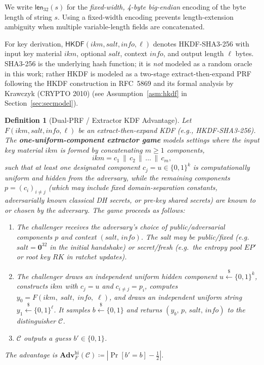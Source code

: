 \documentclass[11pt,a4paper]{article}
\newtheorem{definition}[theorem]{Definition}
\theoremstyle{remark}
\theoremstyle{plain}
\newcommand{\Adv}{\mathbf{Adv}}
\newcommand{\bits}{\{0,1\}}
\newcommand{\getsr}{\stackrel{\$}{\leftarrow}}
\newcommand{\HKDF}{\mathsf{HKDF}}
\newcommand{\flen}[1]{\mathsf{len}_{32}(#1)}
\begin{document}
We write $\flen{s}$ for the \emph{fixed-width, 4-byte big-endian} encoding of the byte length
of string $s$.  Using a fixed-width encoding prevents length-extension ambiguity when multiple
variable-length fields are concatenated.

For key derivation, $\HKDF(ikm, salt, info, \ell)$ denotes HKDF-SHA3-256 with input key
material $ikm$, optional $salt$, context $info$, and output length $\ell$ bytes.  SHA3-256 is
the underlying hash function; it is \emph{not} modeled as a random oracle in this work; rather
HKDF is modeled as a two-stage extract-then-expand PRF following the HKDF construction in
RFC~5869 \cite{rfc5869} and its formal analysis by Krawczyk (CRYPTO 2010)
\cite{krawczyk2010hkdf} (see Assumption~\ref{asm:hkdf} in
Section~\ref{sec:secmodel}).

\begin{definition}[Dual-PRF / Extractor KDF Advantage]
\label{def:kdf-hi}
Let $F(ikm, salt, info, \ell)$ be an extract-then-expand KDF (e.g., HKDF-SHA3-256).
The \textbf{one-uniform-component extractor game} models settings where the
input key material $ikm$ is formed by concatenating $m \geq 1$ components,
\[
  ikm = c_1 \,\|\, c_2 \,\|\, \dots \,\|\, c_m,
\]
such that at least one designated component $c_j = u \in \bits^{k}$ is computationally
uniform and hidden from the adversary, while the remaining components $p = (c_i)_{i \neq j}$
(which may include fixed domain-separation constants, adversarially known classical DH secrets,
or pre-key shared secrets) are known to or chosen by the adversary.  The game proceeds as follows:
\begin{enumerate}
  \item The challenger receives the adversary's choice of public/adversarial components $p$ and
        context $(salt,\, info)$.  The salt may be public/fixed (e.g.\ $salt = \mathbf{0}^{32}$
        in the initial handshake) or secret/fresh (e.g.\ the entropy pool $EP'$ or root key $RK$
        in ratchet updates).
  \item The challenger draws an independent uniform hidden component $u \getsr \bits^{k}$,
        constructs $ikm$ with $c_j = u$ and $c_{i \neq j} = p_i$, computes
        $y_0 = F(ikm,\; salt,\; info,\; \ell)$, and draws an independent uniform string
        $y_1 \getsr \bits^{\ell}$.  It samples $b \getsr \{0,1\}$ and returns
        $(y_b,\, p,\, salt,\, info)$ to the distinguisher $\mathcal{C}$.
  \item $\mathcal{C}$ outputs a guess $b' \in \{0,1\}$.
\end{enumerate}
The advantage is $\Adv^{\mathrm{hi}}_{F}(\mathcal C) \coloneqq |\Pr[b'=b]-\tfrac{1}{2}|$.


\end{definition}
\end{document}
